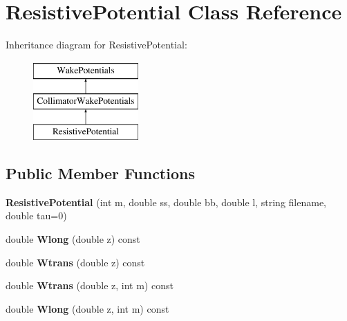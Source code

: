 \hypertarget{classResistivePotential}{}\section{Resistive\+Potential Class Reference}
\label{classResistivePotential}
Inheritance diagram for Resistive\+Potential\+:\begin{figure}[H]
\begin{center}
\leavevmode
\includegraphics[height=3.000000cm]{classResistivePotential}
\end{center}
\end{figure}
\subsection*{Public Member Functions}
\begin{DoxyCompactItemize}
\item 
\mbox{\label{classResistivePotential_a3a950fd163663c7bcd837c0b1ba6ef35}} 
{\bfseries Resistive\+Potential} (int m, double ss, double bb, double l, string filename, double tau=0)
\item 
\mbox{\label{classResistivePotential_a1c22863923684c3a1e778179cfba06a2}} 
double {\bfseries Wlong} (double z) const
\item 
\mbox{\label{classResistivePotential_a010c771ce2175d6d2c4c31d1f79b42fb}} 
double {\bfseries Wtrans} (double z) const
\item 
\mbox{\label{classResistivePotential_a18b408b483dd49c778758578b1a78ff7}} 
double {\bfseries Wtrans} (double z, int m) const
\item 
\mbox{\label{classResistivePotential_abc4701fe36a37388a58f1031618495f6}} 
double {\bfseries Wlong} (double z, int m) const
\end{DoxyCompactItemize}
